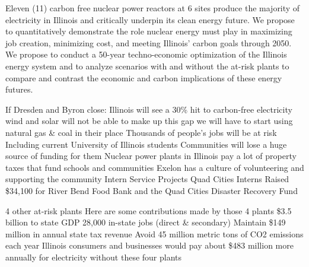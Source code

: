 Eleven (11) carbon free nuclear power reactors at 6 sites produce the majority of 
electricity in Illinois and critically underpin its clean energy future. We 
propose to quantitatively demonstrate the role nuclear energy must play in 
maximizing job creation, minimizing cost, and meeting Illinois’ carbon goals 
through 2050. We propose to conduct a 50-year techno-economic optimization of 
the Illinois energy system and to analyze scenarios with and without the 
at-risk plants to compare and contrast the economic and carbon implications of 
these energy futures. 



If Dresden and Byron close:
Illinois will see a 30\% hit to carbon-free electricity
wind and solar will not be able to make up this  gap
we will have to start using natural gas \& coal in their place
Thousands of people’s jobs will be at risk 
Including current University of Illinois students
Communities will lose a huge source of funding for them 
Nuclear power plants in Illinois pay a lot of property taxes that fund schools and communities
Exelon has a culture of volunteering and supporting the community
Intern Service Projects
Quad Cities Interns Raised \$34,100 for River Bend Food Bank and the Quad Cities Disaster Recovery Fund

4 other at-risk plants
Here are some contributions made by those 4 plants  
\$3.5 billion to state GDP
28,000 in-state jobs (direct & secondary)
Maintain \$149 million in annual state tax revenue 
Avoid 45 million metric tons of CO2 emissions each year
Illinois consumers and businesses would pay about \$483 million 
more annually for electricity without these four plants

